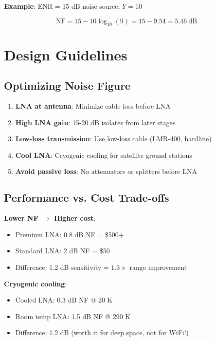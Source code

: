 \textbf{Example}: ENR = 15 dB noise source, $Y = 10$

\begin{equation}
\text{NF} = 15 - 10\log_{10}(9) = 15 - 9.54 = 5.46~\text{dB}
\end{equation}

\section{Design Guidelines}

\subsection{Optimizing Noise Figure}

\begin{enumerate}
\item \textbf{LNA at antenna}: Minimize cable loss before LNA
\item \textbf{High LNA gain}: 15-20 dB isolates from later stages
\item \textbf{Low-loss transmission}: Use low-loss cable (LMR-400, hardline)
\item \textbf{Cool LNA}: Cryogenic cooling for satellite ground stations
\item \textbf{Avoid passive loss}: No attenuators or splitters before LNA
\end{enumerate}

\subsection{Performance vs. Cost Trade-offs}

\textbf{Lower NF $\rightarrow$ Higher cost}:
\begin{itemize}
\item Premium LNA: 0.8 dB NF = \$500+
\item Standard LNA: 2 dB NF = \$50
\item Difference: 1.2 dB sensitivity = $1.3\times$ range improvement
\end{itemize}

\textbf{Cryogenic cooling}:
\begin{itemize}
\item Cooled LNA: 0.3 dB NF @ 20 K
\item Room temp LNA: 1.5 dB NF @ 290 K
\item Difference: 1.2 dB (worth it for deep space, not for WiFi!)
\end{itemize}

